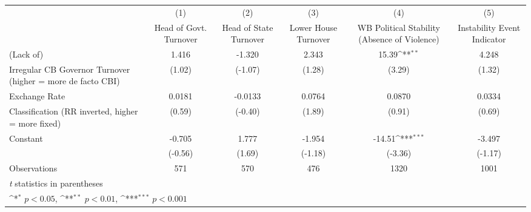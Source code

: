 {
\def\sym#1{\ifmmode^{#1}\else\(^{#1}\)\fi}
\begin{tabular}{l*{5}{c}}
\toprule
                &\multicolumn{1}{c}{(1)}&\multicolumn{1}{c}{(2)}&\multicolumn{1}{c}{(3)}&\multicolumn{1}{c}{(4)}&\multicolumn{1}{c}{(5)}\\
                &\multicolumn{1}{c}{Head of Govt. Turnover}&\multicolumn{1}{c}{Head of State Turnover}&\multicolumn{1}{c}{Lower House Turnover}&\multicolumn{1}{c}{WB Political Stability (Absence of Violence)}&\multicolumn{1}{c}{Instability Event Indicator}\\
\midrule
(Lack of)       &    1.416         &   -1.320         &    2.343         &    15.39\sym{**} &    4.248         \\
Irregular CB Governor Turnover (higher = more de facto CBI)&   (1.02)         &  (-1.07)         &   (1.28)         &   (3.29)         &   (1.32)         \\
\addlinespace
Exchange Rate   &   0.0181         &  -0.0133         &   0.0764         &   0.0870         &   0.0334         \\
Classification (RR inverted, higher = more fixed)&   (0.59)         &  (-0.40)         &   (1.89)         &   (0.91)         &   (0.69)         \\
\addlinespace
Constant        &   -0.705         &    1.777         &   -1.954         &   -14.51\sym{***}&   -3.497         \\
                &  (-0.56)         &   (1.69)         &  (-1.18)         &  (-3.36)         &  (-1.17)         \\
\midrule
Observations    &      571         &      570         &      476         &     1320         &     1001         \\
\bottomrule
\multicolumn{6}{l}{\footnotesize \textit{t} statistics in parentheses}\\
\multicolumn{6}{l}{\footnotesize \sym{*} \(p<0.05\), \sym{**} \(p<0.01\), \sym{***} \(p<0.001\)}\\
\end{tabular}
}
